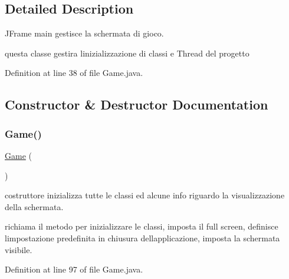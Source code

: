 \subsection{Detailed Description}
J\+Frame main gestisce la schermata di gioco. 

questa classe gestira l\textquotesingle{}inizializzazione di classi e Thread del progetto 

Definition at line 38 of file Game.\+java.



\subsection{Constructor \& Destructor Documentation}
\mbox{\label{classprogetto_1_1_game_a98d87ba6bde3f389e92664a2ef9bfcb1}} 
\subsubsection{\texorpdfstring{Game()}{Game()}}
{\footnotesize\ttfamily \hyperlink{classprogetto_1_1_game}{Game} (\begin{DoxyParamCaption}{ }\end{DoxyParamCaption})}



costruttore inizializza tutte le classi ed alcune info riguardo la visualizzazione della schermata. 

richiama il metodo per inizializzare le classi, imposta il full screen, definisce l\textquotesingle{}impostazione predefinita in chiusura dell\textquotesingle{}applicazione, imposta la schermata visibile. 

Definition at line 97 of file Game.\+java.

